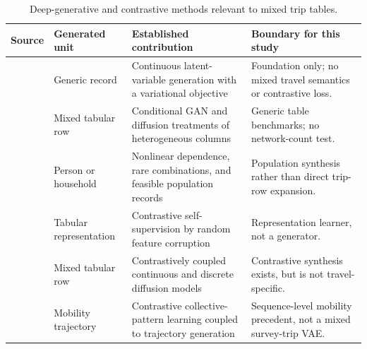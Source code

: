\begin{table}[!htbp]
\caption{Deep-generative and contrastive methods relevant to mixed trip tables.}
\label{tab:literature_deep}
\centering
\setlength{\tabcolsep}{3.0pt}
\begin{tabularx}{\textwidth}{P{0.15\textwidth} P{0.18\textwidth} Y Y}
\toprule
\textbf{Source} & \textbf{Generated unit} & \textbf{Established contribution} & \textbf{Boundary for this study} \\
\midrule
\cite{kingma2014vae} & Generic record & Continuous latent-variable generation with a variational objective & Foundation only; no mixed travel semantics or contrastive loss. \\
\cite{xu2019ctgan,kotelnikov2023tabddpm} & Mixed tabular row & Conditional GAN and diffusion treatments of heterogeneous columns & Generic table benchmarks; no network-count test. \\
\cite{borysov2019microagents,garrido2020rare,kim2023feasible} & Person or household & Nonlinear dependence, rare combinations, and feasible population records & Population synthesis rather than direct trip-row expansion. \\
\cite{bahri2022scarf} & Tabular representation & Contrastive self-supervision by random feature corruption & Representation learner, not a generator. \\
\cite{lee2023codi} & Mixed tabular row & Contrastively coupled continuous and discrete diffusion models & Contrastive synthesis exists, but is not travel-specific. \\
\cite{li2026syncmove} & Mobility trajectory & Contrastive collective-pattern learning coupled to trajectory generation & Sequence-level mobility precedent, not a mixed survey-trip VAE. \\
\bottomrule
\end{tabularx}
\end{table}
